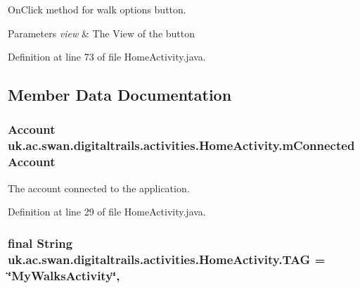 On\+Click method for walk options button. 


\begin{DoxyParams}{Parameters}
{\em view} & The View of the button \\
\hline
\end{DoxyParams}


Definition at line 73 of file Home\+Activity.\+java.



\subsection{Member Data Documentation}
\hypertarget{classuk_1_1ac_1_1swan_1_1digitaltrails_1_1activities_1_1_home_activity_a42bf8dfc43613b3d67f747722caf3b9f}{
\subsubsection[{m\+Connected\+Account}]{\setlength{\rightskip}{0pt plus 5cm}Account uk.\+ac.\+swan.\+digitaltrails.\+activities.\+Home\+Activity.\+m\+Connected\+Account\hspace{0.3cm}{\ttfamily [private]}}}\label{classuk_1_1ac_1_1swan_1_1digitaltrails_1_1activities_1_1_home_activity_a42bf8dfc43613b3d67f747722caf3b9f}


The account connected to the application. 



Definition at line 29 of file Home\+Activity.\+java.

\hypertarget{classuk_1_1ac_1_1swan_1_1digitaltrails_1_1activities_1_1_home_activity_af6892ecddd1df5453d1bb1a37a3769c3}{
\subsubsection[{T\+A\+G}]{\setlength{\rightskip}{0pt plus 5cm}final String uk.\+ac.\+swan.\+digitaltrails.\+activities.\+Home\+Activity.\+T\+A\+G = \char`\"{}My\+Walks\+Activity\char`\"{}\hspace{0.3cm}{\ttfamily [static]}, {\ttfamily [private]}}}\label{classuk_1_1ac_1_1swan_1_1digitaltrails_1_1activities_1_1_home_activity_af6892ecddd1df5453d1bb1a37a3769c3}


